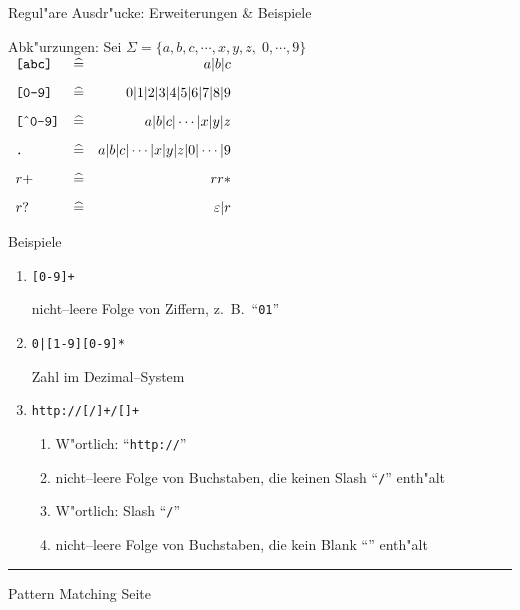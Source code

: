 \begin{slide}{}
\normalsize

\begin{center}
Regul"are Ausdr"ucke: Erweiterungen \& Beispiele
\end{center}
\vspace*{0.5cm}

\footnotesize
Abk"urzungen: Sei $\Sigma = \{a,b,c, \cdots, x,y,z,\;0,\cdots,9 \}$ \\[0.3cm]
\hspace*{1.3cm} 
$
\begin{array}{lcr}
\texttt{[abc]}                      & \widehat{=} & a|b|c                           \\[0.3cm]
\texttt{[0-9]}                      & \widehat{=} & 0|1|2|3|4|5|6|7|8|9             \\[0.3cm]
\texttt{[}\symbol{94}\texttt{0-9]}  & \widehat{=} & a|b|c|\cdots|x|y|z              \\[0.3cm]
\texttt{.}                          & \widehat{=} & a|b|c| \cdots |x|y|z|0|\cdots|9 \\[0.3cm]
r+                                  & \widehat{=} & rr*                             \\[0.3cm]
r?                                  & \widehat{=} & \varepsilon|r 
\end{array}
$

Beispiele
\begin{enumerate}
\item \texttt{[0-9]+}

      nicht--leere Folge von Ziffern, z.~B.~``\texttt{01}''
\item \texttt{0|[1-9][0-9]*}

      Zahl im Dezimal--System
\item \texttt{http://[/]+/[]+}
      \begin{enumerate}
      \item W"ortlich: ``\texttt{http://}'' 
      \item nicht--leere Folge von Buchstaben, die keinen Slash ``\texttt{/}'' enth"alt
      \item W"ortlich: Slash ``\texttt{/}''
      \item nicht--leere Folge von Buchstaben, die kein Blank ``\texttt{}'' enth"alt
      \end{enumerate}
\end{enumerate}

\vspace*{\fill}
\tiny \addtocounter{mypage}{1}
\rule{17cm}{1mm}
Pattern Matching \hspace*{\fill} Seite 
\end{slide}

